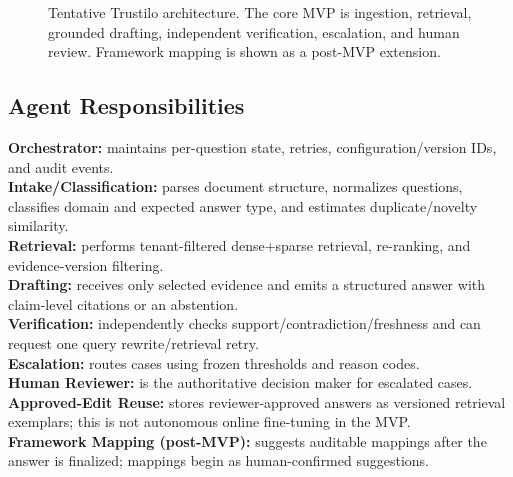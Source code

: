 \documentclass[11pt,journal,onecolumn]{IEEEtran}
\begin{document}
\begin{figure}[H]
{}
\caption{Tentative Trustilo architecture. The core MVP is ingestion, retrieval, grounded drafting, independent verification, escalation, and human review. Framework mapping is shown as a post-MVP extension.}
\label{fig:architecture}
\end{figure}

\subsection{Agent Responsibilities}
\textbf{Orchestrator:} maintains per-question state, retries, configuration/version IDs, and audit events.\\
\textbf{Intake/Classification:} parses document structure, normalizes questions, classifies domain and expected answer type, and estimates duplicate/novelty similarity.\\
\textbf{Retrieval:} performs tenant-filtered dense+sparse retrieval, re-ranking, and evidence-version filtering.\\
\textbf{Drafting:} receives only selected evidence and emits a structured answer with claim-level citations or an abstention.\\
\textbf{Verification:} independently checks support/contradiction/freshness and can request one query rewrite/retrieval retry.\\
\textbf{Escalation:} routes cases using frozen thresholds and reason codes.\\
\textbf{Human Reviewer:} is the authoritative decision maker for escalated cases.\\
\textbf{Approved-Edit Reuse:} stores reviewer-approved answers as versioned retrieval exemplars; this is not autonomous online fine-tuning in the MVP.\\
\textbf{Framework Mapping (post-MVP):} suggests auditable mappings after the answer is finalized; mappings begin as human-confirmed suggestions.
\end{document}
